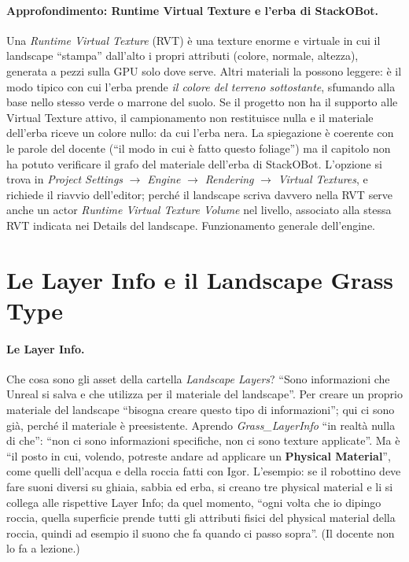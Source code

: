 \paragraph{Approfondimento: Runtime Virtual Texture e l'erba di StackOBot.} Una
\emph{Runtime Virtual Texture} (RVT) è una texture enorme e virtuale in cui il landscape
``stampa'' dall'alto i propri attributi (colore, normale, altezza), generata a pezzi sulla
GPU solo dove serve. Altri materiali la possono leggere: è il modo tipico con cui l'erba
prende \emph{il colore del terreno sottostante}, sfumando alla base nello stesso verde
o marrone del suolo. Se il progetto non ha il supporto alle Virtual Texture attivo, il
campionamento non restituisce nulla e il materiale dell'erba riceve un colore nullo: da cui
l'erba nera. La spiegazione è coerente con le parole del docente (``il modo in cui è fatto
questo foliage'') ma il capitolo non ha potuto verificare il grafo del materiale dell'erba
di StackOBot. L'opzione si trova in \emph{Project Settings} $\rightarrow$ \emph{Engine}
$\rightarrow$ \emph{Rendering} $\rightarrow$ \emph{Virtual Textures}, e richiede il riavvio
dell'editor; perché il landscape scriva davvero nella RVT serve anche un actor
\emph{Runtime Virtual Texture Volume} nel livello, associato alla stessa RVT indicata nei
Details del landscape. Funzionamento generale dell'engine.

\section{Le Layer Info e il Landscape Grass Type}
\label{ue14:sec:grasstype}

\paragraph{Le Layer Info.} Che cosa sono gli asset della cartella \emph{Landscape Layers}?
``Sono informazioni che Unreal si salva e che utilizza per il materiale del landscape''. Per
creare un proprio materiale del landscape ``bisogna creare questo tipo di informazioni''; qui
ci sono già, perché il materiale è preesistente. Aprendo \emph{Grass\_LayerInfo} ``in realtà
nulla di che'': ``non ci sono informazioni specifiche, non ci sono texture applicate''. Ma è
``il posto in cui, volendo, potreste andare ad applicare un \textbf{Physical Material}'',
come quelli dell'acqua e della roccia fatti con Igor. L'esempio: se il robottino deve fare
suoni diversi su ghiaia, sabbia ed erba, si creano tre physical material e li si collega
alle rispettive Layer Info; da quel momento, ``ogni volta che io dipingo roccia, quella
superficie prende tutti gli attributi fisici del physical material della roccia, quindi ad
esempio il suono che fa quando ci passo sopra''. (Il docente non lo fa a lezione.)

